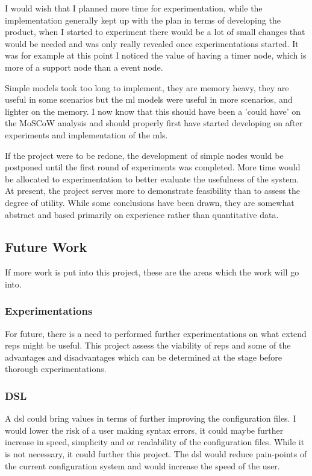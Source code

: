 \documentclass[a4paper,8pt]{article}
\begin{document}
		I would wish that I planned more time for experimentation, while the implementation generally kept up with the plan in terms of developing the product, when I started to experiment there would be a lot of small changes that would be needed and was only really revealed once experimentations started. It was for example at this point I noticed the value of having a timer node, which is more of a support node than a event node.
		
		Simple models took too long to implement, they are memory heavy, they are useful in some scenarios but the \gls{ml} models were useful in more scenarios, and lighter on the memory. I now know that this should have been a 'could have' on the MoSCoW analysis and should properly first have started developing on after experiments and implementation of the \gls{ml}s. 
		
		If the project were to be redone, the development of simple nodes would be postponed until the first round of experiments was completed. More time would be allocated to experimentation to better evaluate the usefulness of the system. At present, the project serves more to demonstrate feasibility than to assess the degree of utility. While some conclusions have been drawn, they are somewhat abstract and based primarily on experience rather than quantitative data.
	
	\subsection{Future Work}
		If more work is put into this project, these are the areas which the work will go into.
		
		\subsubsection{Experimentations}
			For future, there is a need to performed further experimentations on what extend \gls{reps} might be useful. This project assess the viability of \gls{reps} and some of the advantages and disadvantages which can be determined at the stage before thorough experimentations.
		
		\subsubsection{DSL}
			A \gls{dsl} could bring values in terms of further improving the configuration files. I would lower the risk of a user making syntax errors, it could maybe further increase in speed, simplicity and or readability of the configuration files. While it is not necessary, it could further this project. The \gls{dsl} would reduce pain-points of the current configuration system and would increase the speed of the user.
\end{document}
